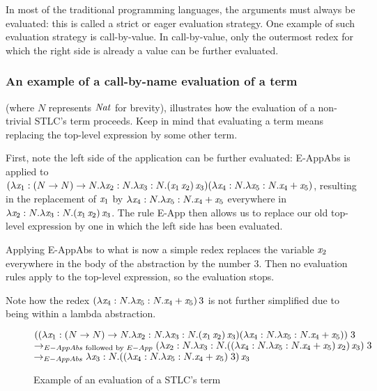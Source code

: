 In most of the traditional programming languages, the arguments must always be evaluated: this is called a strict or eager evaluation strategy. One example of such evaluation strategy is call-by-value. In call-by-value, only the outermost redex for which the right side is already a value can be further evaluated.
\subsubsection{An example of a call-by-name evaluation of a term}
 (where $N$ represents $\mathit{Nat}$ for brevity), illustrates how the evaluation of a non-trivial STLC's term proceeds. Keep in mind that evaluating a term means replacing the top-level expression by some other term.

First, note the left side of the application can be further evaluated: E-AppAbs is applied to $(\lambda \mathit{x}_1: (N \rightarrow N)\rightarrow N.\lambda \mathit{x}_2:N.\lambda \mathit{x}_3: N . (\mathit{x}_1 \, \mathit{x}_2)\,\mathit{x}_3) (\lambda \mathit{x}_4:N. \lambda \mathit{x}_5:N. \mathit{x}_4 + \mathit{x}_5)$, resulting in the replacement of $\mathit{x}_1$ by $\lambda \mathit{x}_4:N. \lambda \mathit{x}_5:N. \mathit{x}_4 + \mathit{x}_5$ everywhere in $\lambda \mathit{x}_2:N.\lambda \mathit{x}_3: N . (\mathit{x}_1 \, \mathit{x}_2)\,\mathit{x}_3$. The rule E-App then allows us to replace our old top-level expression by one in which the left side has been evaluated.

Applying E-AppAbs to what is now a simple redex replaces the variable $\mathit{x}_2$ everywhere in the body of the abstraction by the number $3$. Then no evaluation rules apply to the top-level expression, so the evaluation stops.

Note how the redex $(\lambda \mathit{x}_4:N. \lambda \mathit{x}_5:N. \mathit{x}_4 + \mathit{x}_5) \, 3$ is not further simplified due to being within a lambda abstraction.
\begin{figure}
    $((\lambda \mathit{x}_1: (N \rightarrow N)\rightarrow N.\lambda \mathit{x}_2:N.\lambda \mathit{x}_3: N . (\mathit{x}_1 \, \mathit{x}_2)\,\mathit{x}_3) (\lambda \mathit{x}_4:N. \lambda \mathit{x}_5:N. \mathit{x}_4 + \mathit{x}_5))\;3$
    \\
$\rightarrow_{E-AppAbs\text{ followed by }E-App}(\lambda \mathit{x}_2:N.\lambda \mathit{x}_3: N. ((\lambda \mathit{x}_4:N. \lambda \mathit{x}_5:N. \mathit{x}_4 + \mathit{x}_5) \, \mathit{x}_2)\,\mathit{x}_3)\; 3 $\\
    $\rightarrow_{E-AppAbs}\lambda \mathit{x}_3: N. ((\lambda \mathit{x}_4:N. \lambda \mathit{x}_5:N. \mathit{x}_4 + \mathit{x}_5) \; 3)\,\mathit{x}_3 $

  \caption{Example of an evaluation of a STLC's term}
  \label{stlcexeval}
\end{figure}
